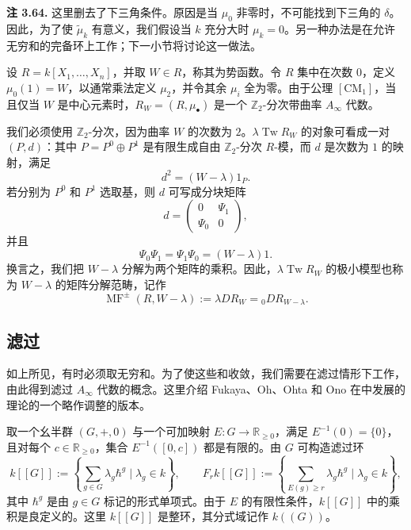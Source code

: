 \begin{note}\label{note:curved-twists}
\textbf{注 3.64.} 这里删去了下三角条件。原因是当 $\mu_0$ 非零时，不可能找到下三角的 $\delta$。因此，为了使 $\widetilde\mu_k$ 有意义，我们假设当 $k$ 充分大时 $\mu_k=0$。另一种办法是在允许无穷和的完备环上工作；下一小节将讨论这一做法。
\end{note}

\begin{example}[势函数与矩阵分解]\label{ex:matrix-factorizations-from-potential}
设 $R=k[X_1,\ldots,X_n]$，并取 $W\in R$，称其为势函数。令 $R$ 集中在次数 $0$，定义 $\mu_0(1)=W$，以通常乘法定义 $\mu_2$，并令其余 $\mu_i$ 全为零。由于公理 $[\mathrm{CM}_1]$，当且仅当 $W$ 是中心元素时，$R_W=(R,\mu_\bullet)$ 是一个 $\mathbb Z_2$-分次带曲率 $A_\infty$ 代数。

我们必须使用 $\mathbb Z_2$-分次，因为曲率 $W$ 的次数为 $2$。$\lambda\operatorname{Tw}R_W$ 的对象可看成一对 $(P,d)$：其中 $P=P^0\oplus P^1$ 是有限生成自由 $\mathbb Z_2$-分次 $R$-模，而 $d$ 是次数为 $1$ 的映射，满足
\[
  d^2=(W-\lambda)1_P.
\]
若分别为 $P^0$ 和 $P^1$ 选取基，则 $d$ 可写成分块矩阵
\[
  d=\begin{pmatrix}0&\Psi_1\\\Psi_0&0\end{pmatrix},
\]
并且
\[
  \Psi_0\Psi_1=\Psi_1\Psi_0=(W-\lambda)1.
\]
换言之，我们把 $W-\lambda$ 分解为两个矩阵的乘积。因此，$\lambda\operatorname{Tw}R_W$ 的极小模型也称为 $W-\lambda$ 的矩阵分解范畴，记作
\[
  \operatorname{MF}^{\pm}(R,W-\lambda)
  :=\lambda D R_W={}_0D R_{W-\lambda}.
\]
\end{example}

\subsection{滤过}\label{subsec:filtered-ainfty}
如上所见，有时必须取无穷和。为了使这些和收敛，我们需要在滤过情形下工作，由此得到滤过 $A_\infty$ 代数的概念。这里介绍 Fukaya、Oh、Ohta 和 Ono 在中发展的理论的一个略作调整的版本。

取一个幺半群 $(G,+,0)$ 与一个可加映射 $E\colon G\to\mathbb R_{\geq0}$，满足 $E^{-1}(0)=\{0\}$，且对每个 $c\in\mathbb R_{\geq0}$，集合 $E^{-1}([0,c])$ 都是有限的。由 $G$ 可构造滤过环
\[
  k[[G]]:=\left\{\sum_{g\in G}\lambda_g\hbar^g\mid\lambda_g\in k\right\},
  \qquad
  F_rk[[G]]:=\left\{\sum_{E(g)\geq r}\lambda_g\hbar^g\mid\lambda_g\in k\right\},
\]
其中 $\hbar^g$ 是由 $g\in G$ 标记的形式单项式。由于 $E$ 的有限性条件，$k[[G]]$ 中的乘积是良定义的。这里 $k[[G]]$ 是整环，其分式域记作 $k((G))$。

